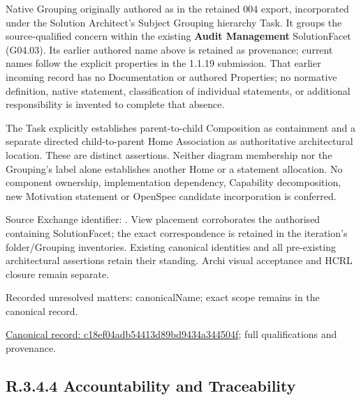 Native Grouping originally authored as \texttt{} in the retained 004 export,
incorporated under the Solution Architect's Subject Grouping hierarchy Task.
It groups the source-qualified \texttt{} concern within
the existing \textbf{Audit Management} SolutionFacet (G04.03). Its earlier authored name above is retained as provenance; current names
follow the explicit properties in the 1.1.19 submission.
That earlier incoming record has no Documentation or authored Properties; no normative
definition, native statement, classification of individual statements, or
additional responsibility is invented to complete that absence.



The Task explicitly establishes parent-to-child Composition as containment and
a separate directed child-to-parent Home Association as authoritative architectural
location. These are distinct assertions. Neither diagram membership nor the
Grouping's label alone establishes another Home or a statement allocation.
No component ownership, implementation dependency, Capability decomposition,
new Motivation statement or OpenSpec candidate incorporation is conferred.



Source Exchange identifier: \texttt{}. View placement corroborates
the authorised containing SolutionFacet; the exact correspondence is retained in the
iteration's folder/Grouping inventories. Existing canonical identities and all
pre-existing architectural assertions retain their standing. Archi visual
acceptance and HCRL closure remain separate.


{\small Recorded unresolved matters: canonicalName; exact scope remains in the canonical record.}\par
{\footnotesize \href{../../../../../../../continuum/grouping/c18ef04adb54413d89bd9434a344504f.md}{Canonical record: c18ef04adb54413d89bd9434a344504f}; full qualifications and provenance.}\par
\subsection*{R.3.4.4 Accountability and Traceability}
\label{navigation:R.3.4.4}

